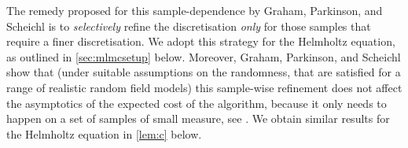 The remedy proposed for this sample-dependence by Graham, Parkinson, and Scheichl is to \emph{selectively} refine the discretisation \emph{only} for those samples that require a finer discretisation. We adopt this strategy for the Helmholtz equation, as outlined in \cref{sec:mlmcsetup} below. Moreover, Graham, Parkinson, and Scheichl show that (under suitable assumptions on the randomness, that are satisfied for a range of realistic random field models) this sample-wise refinement does not affect the asymptotics of the expected cost of the algorithm, because it only needs to happen on a set of samples of small measure, see \cite[Lemma 5.8]{GrPaSc:19}. We obtain similar results for the Helmholtz equation in \cref{lem:c} below.


